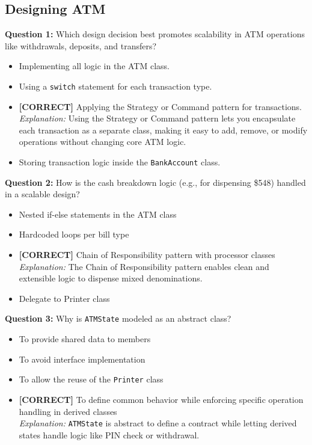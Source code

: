 \subsection*{Designing ATM}
\vspace{0.3cm}
\noindent
\textbf{Question 1:} Which design decision best promotes scalability in ATM operations like withdrawals, deposits, and transfers?
\\[0.2cm]
\begin{itemize}
 \item Implementing all logic in the ATM class.
 \item Using a \texttt{switch} statement for each transaction type.
 \item \textbf{[CORRECT]} Applying the Strategy or Command pattern for transactions.
\\[0.1cm]
\textit{Explanation:} 
Using the Strategy or Command pattern lets you encapsulate each transaction as a separate class, making it easy to add, remove, or modify operations without changing core ATM logic.
 \item Storing transaction logic inside the \texttt{BankAccount} class.
\end{itemize}
\vspace{0.3cm}
\noindent
\textbf{Question 2:} How is the cash breakdown logic (e.g., for dispensing \$548) handled in a scalable design?
\\[0.2cm]
\begin{itemize}
 \item Nested if-else statements in the ATM class
 \item Hardcoded loops per bill type
 \item \textbf{[CORRECT]} Chain of Responsibility pattern with processor classes
\\[0.1cm]
\textit{Explanation:} 
The Chain of Responsibility pattern enables clean and extensible logic to dispense mixed denominations.
 \item Delegate to Printer class
\end{itemize}
\vspace{0.3cm}
\noindent
\textbf{Question 3:} Why is \texttt{ATMState} modeled as an abstract class?
\\[0.2cm]
\begin{itemize}
 \item To provide shared data to members
 \item To avoid interface implementation
 \item To allow the reuse of the \texttt{Printer} class
 \item \textbf{[CORRECT]} To define common behavior while enforcing specific operation handling in derived classes
\\[0.1cm]
\textit{Explanation:} 
\texttt{ATMState} is abstract to define a contract while letting derived states handle logic like PIN check or withdrawal.
\end{itemize}
